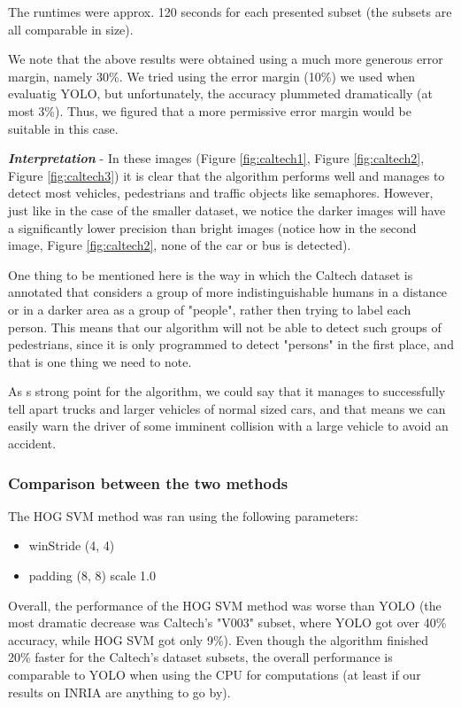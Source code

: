 \documentclass[runningheads,a4paper,11pt]{report}
\begin{document}
The runtimes were approx. 120 seconds for each presented subset (the subsets are all comparable in size).

We note that the above results were obtained using a much more generous error margin, namely 30\%. We tried using the error margin (10\%) we used when evaluatig YOLO, but unfortunately, the accuracy plummeted dramatically (at most 3\%). Thus, we figured that a more permissive error margin would be suitable in this case.

\textbf{\emph{Interpretation}} - In these images (Figure \ref{fig:caltech1}, Figure \ref{fig:caltech2}, Figure \ref{fig:caltech3}) it is clear that the algorithm performs well and manages to detect most vehicles, pedestrians and traffic objects like semaphores. However, just like in the case of the smaller dataset, we notice the darker images will have a significantly lower precision than bright images (notice how in the second image, Figure \ref{fig:caltech2}, none of the car or bus is detected). 

One thing to be mentioned here is the way in which the Caltech dataset is annotated that considers a group of more indistinguishable humans in a distance or in a darker area as a group of "people", rather then trying to label each person. This means that our algorithm will not be able to detect such groups of pedestrians, since it is only programmed to detect "persons" in the first place, and that is one thing we need to note.
 
 As s strong point for the algorithm, we could say that it manages to successfully tell apart trucks and larger vehicles of normal sized cars, and that means we can easily warn the driver of some imminent collision with a large vehicle to avoid an accident.

\subsubsection{Comparison between the two methods}

The HOG SVM method was ran using the following parameters:

\begin{itemize}
    \item winStride (4, 4)
    \item padding (8, 8)
    \items scale 1.0
\end{itemize}

Overall, the performance of the HOG SVM method was worse than YOLO (the most dramatic decrease was Caltech's "V003" subset, where YOLO got over 40\% accuracy, while HOG SVM got only 9\%). Even though the algorithm finished 20\% faster for the Caltech's dataset subsets, the overall performance is comparable to YOLO when using the CPU for computations (at least if our results on INRIA are anything to go by).
\end{document}
